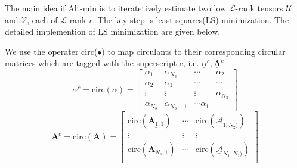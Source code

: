 \documentclass[journal,article,submit,moreauthors,pdftex,10pt,a4paper]{Definitions/mdpi}
\theoremstyle{plain}
\theoremstyle{definition}
\theoremstyle{remark}
\begin{document}
The main idea if Alt-min is to iteratetively estimate two low $\mathcal{L}$-rank tensors $\mathcal{U}$ and $\mathcal{V}$, each of $\mathcal{L}$ rank $r$. The key step is least 
squares(LS) minimization. The detailed implemention of LS minimization are given below.

We use the operater circ($\bullet$) to map circulants to their corresponding circular matrices which are tagged with the superscript $c$, i.e. $\underline{\alpha}^c, \underline{\mathbf{A}}^c$:
\[
    \underline{\alpha}^c = \text{circ}(\underline{\alpha}) = \begin{bmatrix}
        \alpha_1 & \alpha_{N_3} & \cdots  & \alpha_2 \\
        \alpha_2 & \alpha_1 & \cdots & \cdots \\
        \vdots & \vdots & \vdots & \alpha_{N_3} \\
        \alpha_{N_3} & \alpha_{N_3-1} & \cdots \alpha_1
    \end{bmatrix}
    \]
    \[
        \underline{\mathbf{A}}^c = \text{circ}(\underline{\mathbf{A}}) = \begin{bmatrix}
            \text{circ}(\underline{\mathbf{A}_{1,1}})  & \cdots & \text{circ}(\underline{\mathcal{A}}_{1,N_2)}) \\
            \vdots & \vdots & \vdots \\
            \text{circ}(\underline{\mathbf{A}_{N_1,1}})  & \cdots & \text{circ}(\underline{\mathcal{A}}_{N_1,N_2)}) \\
        \end{bmatrix}
        \]
\end{document}
